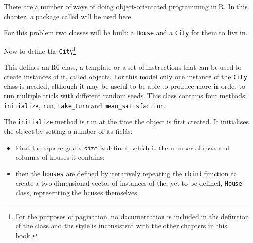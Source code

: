 There are a number of ways of doing object-orientated programming in R.
In this chapter, a package called  will be used here.

For this problem two classes will be built: a
\texttt{House} and a \texttt{City} for them to live in.

Now to define the \texttt{City}\footnote{
For the purposes of pagination, no documentation is included in the definition
of the class and the style is inconsistent with the other chapters in this book.
}


This defines an R6 class, a template or a set of instructions that can be used
to create instances of it, called objects.
For this model only one instance of the \texttt{City} class is needed,
although it may be useful to be able to produce more in order to run multiple
trials with different random seeds.
This class contains four methods: \texttt{initialize},
\texttt{run}, \texttt{take_turn} and
\texttt{mean_satisfaction}.

The \texttt{initialize} method is run at the time the object is first
created.
It initialises the object by setting a number of its fields:

\begin{itemize}
     \item First the square grid's \texttt{size} is defined, which
           is the number of rows and columns of houses it contains;
     \item then the \texttt{houses} are defined by iteratively repeating
           the \texttt{rbind} function to create a two-dimensional vector
           of instances of the, yet to be defined, \texttt{House} class,
           representing the houses themselves.
\end{itemize}

